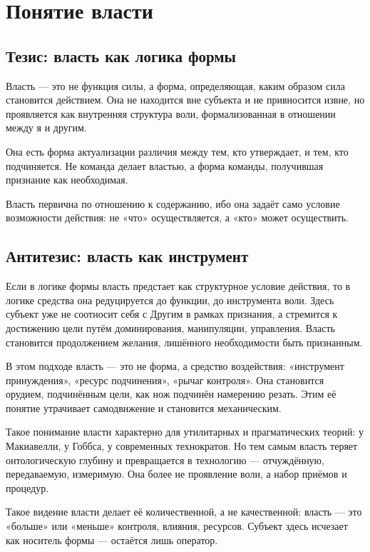 \chapter{Понятие власти}

\section{Тезис: власть как логика формы}

Власть — это не функция силы, а форма, определяющая, каким образом сила становится действием. Она не находится вне субъекта и не привносится извне, но проявляется как внутренняя структура воли, формализованная в отношении между я и другим.

Она есть форма актуализации различия между тем, кто утверждает, и тем, кто подчиняется. Не команда делает властью, а форма команды, получившая признание как необходимая.

Власть первична по отношению к содержанию, ибо она задаёт само условие возможности действия: не «что» осуществляется, а «кто» может осуществить.

\section{Антитезис: власть как инструмент}

Если в логике формы власть предстает как структурное условие действия, то в логике средства она редуцируется до функции, до инструмента воли. Здесь субъект уже не соотносит себя с Другим в рамках признания, а стремится к достижению цели путём доминирования, манипуляции, управления. Власть становится продолжением желания, лишённого необходимости быть признанным.

В этом подходе власть — это не форма, а средство воздействия: «инструмент принуждения», «ресурс подчинения», «рычаг контроля». Она становится орудием, подчинённым цели, как нож подчинён намерению резать. Этим её понятие утрачивает самодвижение и становится механическим.

Такое понимание власти характерно для утилитарных и прагматических теорий: у Макиавелли, у Гоббса, у современных технократов. Но тем самым власть теряет онтологическую глубину и превращается в технологию — отчуждённую, передаваемую, измеримую. Она более не проявление воли, а набор приёмов и процедур.

Такое видение власти делает её количественной, а не качественной: власть — это «больше» или «меньше» контроля, влияния, ресурсов. Субъект здесь исчезает как носитель формы — остаётся лишь оператор.



